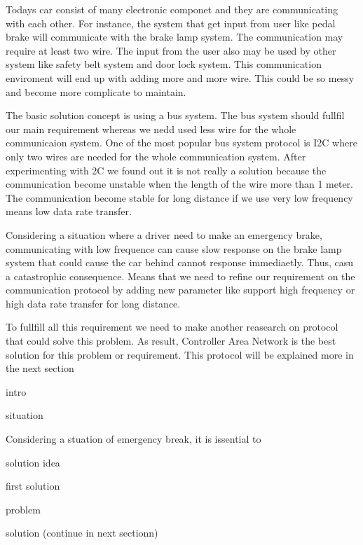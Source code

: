 Todays car consist of many electronic componet and they are communicating with each other.  For instance, the system that get input from user like pedal brake will communicate with the brake lamp system. The communication may require at least two wire. The input from the user also may be used by other system like safety belt system and door lock system. This  communication enviroment will end up with adding more and more wire. This could be so messy and become more complicate to maintain.

The basic solution concept is using a bus system. The bus system should fullfil our main requirement whereas we nedd used less wire for the whole communicaion system. One of the most popular bus system protocol is I2C where only two wires are needed for the whole communication system. After experimenting with 2C we found out it is not really a solution because the communication become unstable when the length of the wire more than 1 meter. The communication become stable for long distance if we use very low frequency means low data rate transfer. 

Considering a situation where a driver need to make an emergency brake, communicating with low frequence can cause slow response on the brake lamp system that could cause the car behind cannot response immediaetly. Thus, casu a catastrophic consequence. Means that we need to refine our requirement on the communication protocol by adding new parameter like support high frequency or high data rate transfer for long distance. 

To fullfill all this requirement we need to make another reasearch on protocol that could solve this problem. As result, Controller Area Network is the best solution for this problem or requirement. This protocol will be explained more in the next section


intro 

situation

Considering a stuation of emergency break, it is issential to 

solution idea

first solution

problem

solution (continue in next sectionn)


